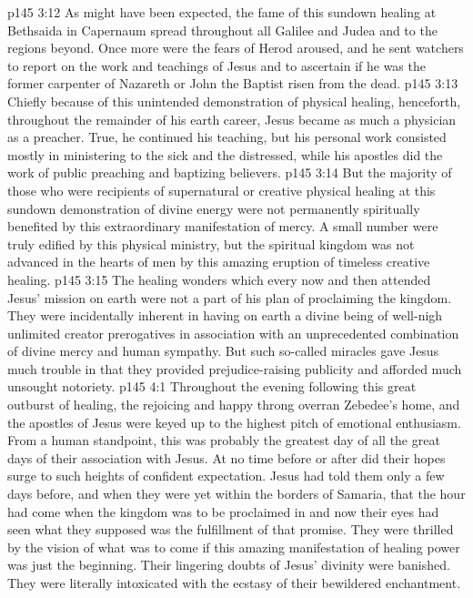 \pc \vs p145 3:12 As might have been expected, the fame of this sundown healing at Bethsaida in Capernaum spread throughout all Galilee and Judea and to the regions beyond. Once more were the fears of Herod aroused, and he sent watchers to report on the work and teachings of Jesus and to ascertain if he was the former carpenter of Nazareth or John the Baptist risen from the dead.
\vs p145 3:13 Chiefly because of this unintended demonstration of physical healing, henceforth, throughout the remainder of his earth career, Jesus became as much a physician as a preacher. True, he continued his teaching, but his personal work consisted mostly in ministering to the sick and the distressed, while his apostles did the work of public preaching and baptizing believers.
\vs p145 3:14 But the majority of those who were recipients of supernatural or creative physical healing at this sundown demonstration of divine energy were not permanently spiritually benefited by this extraordinary manifestation of mercy. A small number were truly edified by this physical ministry, but the spiritual kingdom was not advanced in the hearts of men by this amazing eruption of timeless creative healing.
\vs p145 3:15 The healing wonders which every now and then attended Jesus’ mission on earth were not a part of his plan of proclaiming the kingdom. They were incidentally inherent in having on earth a divine being of well\hyp{}nigh unlimited creator prerogatives in association with an unprecedented combination of divine mercy and human sympathy. But such so\hyp{}called miracles gave Jesus much trouble in that they provided prejudice\hyp{}raising publicity and afforded much unsought notoriety.\plusone
{}
\vs p145 4:1 Throughout the evening following this great outburst of healing, the rejoicing and happy throng overran Zebedee’s home, and the apostles of Jesus were keyed up to the highest pitch of emotional enthusiasm. From a human standpoint, this was probably the greatest day of all the great days of their association with Jesus. At no time before or after did their hopes surge to such heights of confident expectation. Jesus had told them only a few days before, and when they were yet within the borders of Samaria, that the hour had come when the kingdom was to be proclaimed in  and now their eyes had seen what they supposed was the fulfillment of that promise. They were thrilled by the vision of what was to come if this amazing manifestation of healing power was just the beginning. Their lingering doubts of Jesus’ divinity were banished. They were literally intoxicated with the ecstasy of their bewildered enchantment.\plusone
